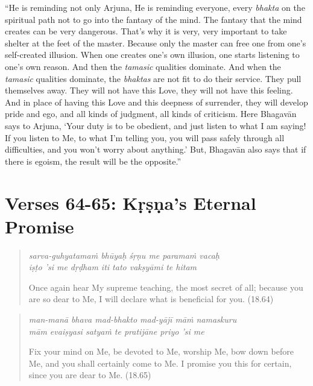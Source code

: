 \documentclass[12pt, twoside, openright]{memoir}
\begin{document}
\enquote{He is reminding not only Arjuna, He is reminding everyone, every \textit{bhakta} on the spiritual path not to go into the fantasy of the mind. The fantasy that the mind creates can be very dangerous. That’s why it is very, very important to take shelter at the feet of the master. Because only the master can free one from one’s self-created illusion. When one creates one’s own illusion, one starts listening to one’s own reason. And then the \textit{tamasic} qualities dominate. And when the \textit{tamasic} qualities dominate, the \textit{bhaktas} are not fit to do their service. They pull themselves away. They will not have this Love, they will not have this feeling. And in place of having this Love and this deepness of surrender, they will develop pride and ego, and all kinds of judgment, all kinds of criticism. Here Bhagavān says to Arjuna, \enquote{Your duty is to be obedient, and just listen to what I am saying! If you listen to Me, to what I’m telling you, you will pass safely through all difficulties, and you won’t worry about anything.} But, Bhagavān also says that if there is egoism, the result will be the opposite.}

\newpage

\section{Verses 64-65: Kṛṣṇa's Eternal Promise}\label{sec-verses-64-65-krsna-s-eternal-promise}


\par
\begin{verse}
\textit{sarva-guhyatamaṁ bhūyaḥ śṛṇu me paramaṁ vacaḥ} \\
\textit{iṣṭo ’si me dṛḍham iti tato vakṣyāmi te hitam}

\noindent Once again hear My supreme teaching, the most secret of all; because you are so dear to Me, I will declare what is beneficial for you. (18.64)
\end{verse}
\par



\par
\begin{verse}
\textit{man-manā bhava mad-bhakto mad-yājī māṁ namaskuru} \\
\textit{mām evaiṣyasi satyaṁ te pratijāne priyo ’si me}

\noindent Fix your mind on Me, be devoted to Me, worship Me, bow down before Me, and you shall certainly come to Me. I promise you this for certain, since you are dear to Me. (18.65)
\end{verse}
\par
\end{document}
